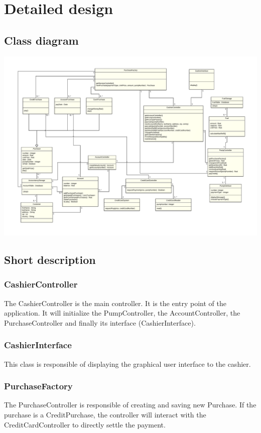 \documentclass[11pt, a4paper]{article}
\begin{document}
\section{Detailed design}
\subsection*{Class diagram}

\begin{center}
\centerline{\includegraphics[angle=90, origin=c, width=1\textwidth]{uml.png}}
\end{center}

\subsection*{Short description}

\subsubsection*{CashierController}
The CashierController is the main controller. It is the entry point of the application. It will initialize the PumpController, the AccountController, the PurchaseController and finally its interface (CashierInterface).

\subsubsection*{CashierInterface}
This class is responsible of displaying the graphical user interface to the cashier.

\subsubsection*{PurchaseFactory}
The PurchaseController is responsible of creating and saving new Purchase. If the purchase is a CreditPurchase, the controller will interact with the CreditCardController to directly settle the payment.
\end{document}
